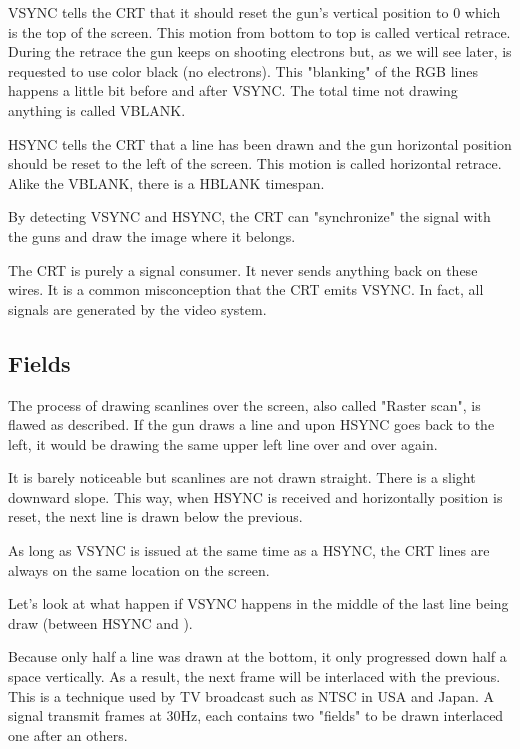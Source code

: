 VSYNC tells the CRT that it should reset the gun's vertical position to 0 which is the top of the screen. This motion from bottom to top is called vertical retrace. During the retrace the gun keeps on shooting electrons but, as we will see later, is requested to use color black (no electrons). This "blanking" of the RGB lines happens a little bit before and after VSYNC. The total time not drawing anything is called VBLANK.

HSYNC tells the CRT that a line has been drawn and the gun horizontal position should be reset to the left of the screen. This motion is called horizontal retrace. Alike the VBLANK, there is a HBLANK timespan.

By detecting VSYNC and HSYNC, the CRT can "synchronize" the signal with the guns and draw the image where it belongs.


\begin{trivia} The CRT is purely a signal consumer. It never sends anything back on these wires. It is a common misconception that the CRT emits VSYNC. In fact, all signals are generated by the video system.
\end{trivia}


\subsection{Fields}

The process of drawing scanlines over the screen, also called "Raster scan", is flawed as described. If the gun draws a line and upon HSYNC goes back to the left, it would be drawing the same upper left line over and over again. 

It is barely noticeable but scanlines are not drawn straight. There is a slight downward slope. This way, when HSYNC is received and horizontally position is reset, the next line is drawn below the previous.




As long as VSYNC is issued at the same time as a HSYNC, the CRT lines are always on the same location on the screen.

Let's look at what happen if VSYNC  happens in the middle of the last line being draw (between HSYNC  and ).


Because only half a line was drawn at the bottom, it only progressed down half a space vertically. As a result, the next frame will be interlaced with the previous. This is a technique used by TV broadcast such as NTSC in USA and Japan. A signal transmit frames at 30Hz, each contains two "fields" to be drawn interlaced one after an others.

